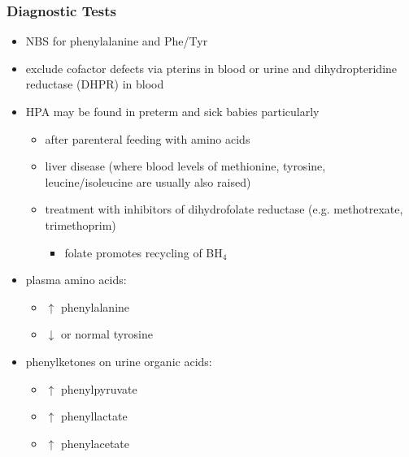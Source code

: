 \documentclass{scrartcl}
\begin{document}
\subsubsection{Diagnostic Tests}
\label{sec:org296d7b2}
\begin{itemize}
\item NBS for phenylalanine and Phe/Tyr
\item exclude cofactor defects via pterins in blood or urine and
dihydropteridine reductase (DHPR) in blood
\item HPA may be found in preterm and sick babies particularly
\begin{itemize}
\item after parenteral feeding with amino acids
\item liver disease (where blood levels of methionine, tyrosine,
leucine/isoleucine are usually also raised)
\item treatment with inhibitors of dihydrofolate reductase (e.g. methotrexate, trimethoprim)
\begin{itemize}
\item folate promotes recycling of BH\(_{\text{4}}\)
\end{itemize}
\end{itemize}
\item plasma amino acids:
\begin{itemize}
\item \(\uparrow\) phenylalanine
\item \(\downarrow\) or normal tyrosine
\end{itemize}
\item phenylketones on urine organic acids:
\begin{itemize}
\item \(\uparrow\) phenylpyruvate
\item \(\uparrow\) phenyllactate
\item \(\uparrow\) phenylacetate
\end{itemize}
\end{itemize}
\end{document}
